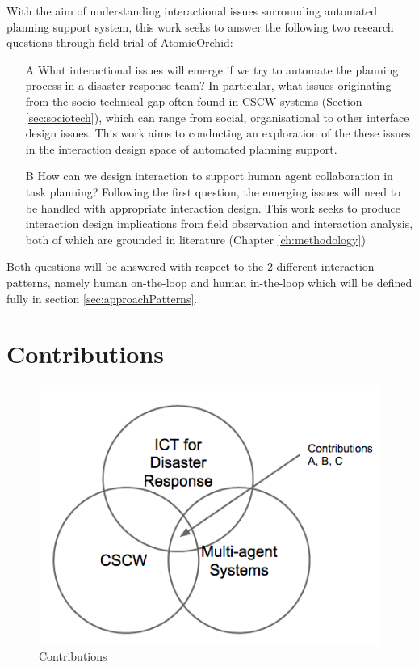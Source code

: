 With the aim of understanding interactional issues surrounding automated planning support system, this work seeks to answer the following two research questions through field trial of AtomicOrchid:

\begin{enumerate}
\item[A] What interactional issues will emerge if we try to automate the planning process in a disaster response team? In particular, what issues originating from the socio-technical gap often found in \ac{CSCW} systems (Section \ref{sec:sociotech}), which can range from social, organisational to other interface design issues. This work aims to conducting an exploration of the these issues in the interaction design space of automated planning support.

\item[B] How can we design interaction to support human agent collaboration in task planning?
Following the first question, the emerging issues will need to be handled with appropriate interaction design. This work seeks to produce interaction design implications from field observation and interaction analysis, both of which are grounded in literature (Chapter \ref{ch:methodology})
\end{enumerate}

Both questions will be answered with respect to the 2 different interaction patterns, namely human on-the-loop and human in-the-loop which will be defined fully in section \ref{sec:approachPatterns}. 

\section{Contributions} 
\begin{figure}[h]
  \centering
  \includegraphics[scale=0.5]{img/introduction/contributions.png}
  \caption{Contributions}
  \label{fig:contributions}
\end{figure}

